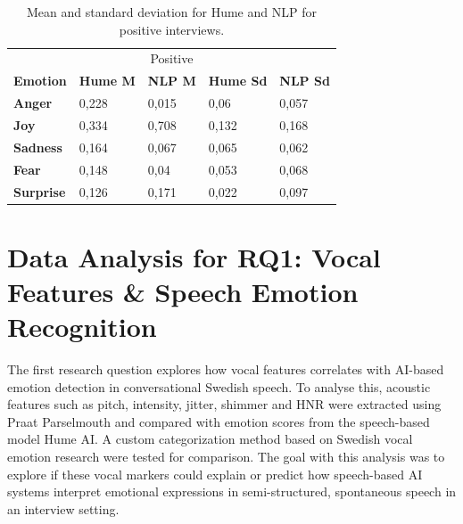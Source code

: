 \begin{table}[H]
    \centering
    \begin{tabular}{lllll}
    \multicolumn{5}{c}{\cellcolor[HTML]{BFBFBF}Positive}                                                                                                                                           \\
    \multicolumn{1}{l|}{\textbf{Emotion}}  & \multicolumn{1}{c}{\textbf{Hume M}} & \multicolumn{1}{c}{\textbf{NLP M}} & \multicolumn{1}{c}{\textbf{Hume Sd}} & \multicolumn{1}{c}{\textbf{NLP Sd}} \\ \hline
    \multicolumn{1}{l|}{\textbf{Anger}}    & 0,228                               & 0,015                              & 0,06                                 & 0,057                               \\
    \multicolumn{1}{l|}{\textbf{Joy}}      & 0,334                               & 0,708                              & 0,132                                & 0,168                               \\
    \multicolumn{1}{l|}{\textbf{Sadness}}  & 0,164                               & 0,067                              & 0,065                                & 0,062                               \\
    \multicolumn{1}{l|}{\textbf{Fear}}     & 0,148                               & 0,04                               & 0,053                                & 0,068                               \\
    \multicolumn{1}{l|}{\textbf{Surprise}} & 0,126                               & 0,171                              & 0,022                                & 0,097                              
    \end{tabular}
    \caption{Mean and standard deviation for Hume and NLP for positive interviews.}
    \label{tab:summery_hume_nlp_pos}
\end{table}


\section{Data Analysis for RQ1: Vocal Features \& Speech Emotion Recognition}
The first research question explores how vocal features correlates with AI-based emotion detection in conversational Swedish speech. 
To analyse this, acoustic features such as pitch, intensity, jitter, shimmer and HNR were extracted using Praat Parselmouth and compared with emotion 
scores from the speech-based model Hume AI. A custom categorization method based on Swedish vocal emotion research \autocite{Ekberg2023} were tested for comparison. 
The goal with this analysis was to explore if these vocal markers could explain or predict how speech-based AI systems interpret emotional expressions in 
semi-structured, spontaneous speech in an interview setting. 

